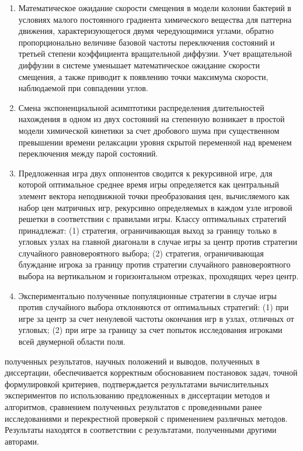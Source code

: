 {}
\begin{enumerate}[beginpenalty=10000] %
    \item Математическое ожидание скорости смещения в модели колонии бактерий в условиях малого постоянного градиента химического вещества для паттерна движения, характеризующегося двумя чередующимися углами, обратно пропорционально величине базовой частоты переключения состояний и третьей степени коэффициента вращательной диффузии. Учет вращательной диффузии в системе уменьшает математическое ожидание скорости смещения, а также приводит к появлению точки максимума скорости, наблюдаемой при совпадении углов.
    \item Смена экспоненциальной асимптотики распределения длительностей нахождения в одном из двух состояний на степенную возникает в простой модели химической кинетики за счет дробового шума при существенном превышении времени релаксации уровня скрытой переменной над временем переключения между парой состояний. 
    \item Предложенная игра двух оппонентов сводится к рекурсивной игре, для которой оптимальное среднее время игры определяется как центральный элемент вектора неподвижной точки преобразования цен, вычисляемого как набор цен матричных игр, рекурсивно определяемых в каждом узле игровой решетки в соответствии с правилами игры. Классу оптимальных стратегий принадлежат: (1) стратегия, ограничивающая выход за границу только в угловых узлах на главной диагонали в случае игры за центр против стратегии случайного равновероятного выбора; (2) стратегия, ограничивающая блуждание игрока за границу против стратегии случайного равновероятного выбора на вертикальном и горизонтальном отрезках, проходящих через центр.
    \item Экспериментально полученные популяционные стратегии в случае игры против случайного выбора отклоняются от оптимальных стратегий: (1) при игре за центр за счет ненулевой частоты окончания игр в узлах, отличных от угловых; (2) при игре за границу за счет попыток исследования игроками всей двумерной области поля. 
\end{enumerate}

{\reliability} полученных результатов, научных положений и выводов, полученных в диссертации, обеспечивается корректным обоснованием постановок задач, точной формулировкой критериев, подтверждается результатами вычислительных экспериментов по использованию предложенных в диссертации методов и алгоритмов, сравнением полученных результатов с проведенными ранее исследованиями и перекрестной проверкой с применением различных методов. Результаты находятся в соответствии с результатами, полученными другими авторами.

